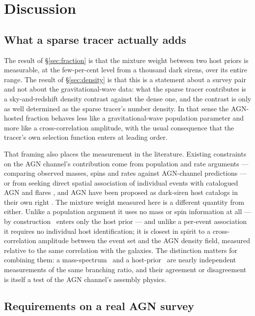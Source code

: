 \section{Discussion}
\label{sec:discussion}

\subsection{What a sparse tracer actually adds}
\label{sec:disc:value}

The result of \S\ref{sec:fraction} is that the mixture weight between two host
priors is measurable, at the few-per-cent level from a thousand dark sirens, over
its entire range. The result of \S\ref{sec:density} is that this is a statement
about a survey pair and not about the gravitational-wave data: what the sparse
tracer contributes is a sky-and-redshift density contrast against the dense one,
and the contrast is only as well determined as the sparse tracer's number
density. In that sense the AGN-hosted fraction behaves less like a
gravitational-wave population parameter and more like a cross-correlation
amplitude, with the usual consequence that the tracer's own selection function
enters at leading order.

That framing also places the measurement in the literature. Existing
constraints on the AGN channel's contribution come from population and rate
arguments --- comparing observed masses, spins and rates against AGN-channel
predictions \citep{Gayathri2021, FordMcKernan2022, GWTC3Pop2023} --- or from
seeking direct spatial association of individual events with catalogued AGN
and flares \citep{Graham2020, Bartos2017}, and AGN have been proposed as
dark-siren host catalogs in their own right \citep{BomPalmese2023}. The
mixture weight measured here is a different quantity from either. Unlike a
population argument it uses no mass or spin information at all --- by
construction \fagn\ enters only the host prior --- and unlike a per-event
association it requires no individual host identification; it is closest in
spirit to a cross-correlation amplitude between the event set and the AGN
density field, measured relative to the same correlation with the galaxies.
The distinction matters for combining them: a mass-spectrum \fagn\ and a
host-prior \fagn\ are nearly independent measurements of the same branching
ratio, and their agreement or disagreement is itself a test of the AGN
channel's assembly physics.

\subsection{Requirements on a real AGN survey}
\label{sec:disc:survey}

